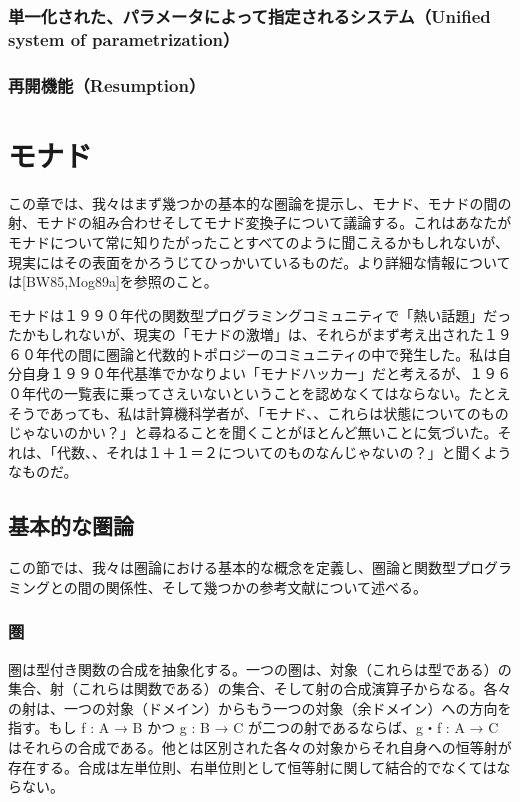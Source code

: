 \documentclass[11pt, oneside]{jsbook}   	%
\begin{document}


\subsection{単一化された、パラメータによって指定されるシステム（Unified system of parametrization）}
\subsection{再開機能（Resumption）}


\newpage
\chapter{モナド}
この章では、我々はまず幾つかの基本的な圏論を提示し、モナド、モナドの間の射、モナドの組み合わせそしてモナド変換子について議論する。これはあなたがモナドについて常に知りたがったことすべてのように聞こえるかもしれないが、現実にはその表面をかろうじてひっかいているものだ。より詳細な情報については[BW85,Mog89a]を参照のこと。

モナドは１９９０年代の関数型プログラミングコミュニティで「熱い話題」だったかもしれないが、現実の「モナドの激増」は、それらがまず考え出された１９６０年代の間に圏論と代数的トポロジーのコミュニティの中で発生した。私は自分自身１９９０年代基準でかなりよい「モナドハッカー」だと考えるが、１９６０年代の一覧表に乗ってさえいないということを認めなくてはならない。たとえそうであっても、私は計算機科学者が、「モナド、、これらは状態についてのものじゃないのかい？」と尋ねることを聞くことがほとんど無いことに気づいた。それは、「代数、、それは１＋１＝２についてのものなんじゃないの？」と聞くようなものだ。

\section{基本的な圏論}
この節では、我々は圏論における基本的な概念を定義し、圏論と関数型プログラミングとの間の関係性、そして幾つかの参考文献について述べる。

\subsection{ 圏 }
圏は型付き関数の合成を抽象化する。一つの圏は、対象（これらは型である）の集合、射（これらは関数である）の集合、そして射の合成演算子からなる。各々の射は、一つの対象（ドメイン）からもう一つの対象（余ドメイン）への方向を指す。もし f : A → B かつ g : B → C が二つの射であるならば、g・f : A → C はそれらの合成である。他とは区別された各々の対象からそれ自身への恒等射が存在する。合成は左単位則、右単位則として恒等射に関して結合的でなくてはならない。
\end{document}
